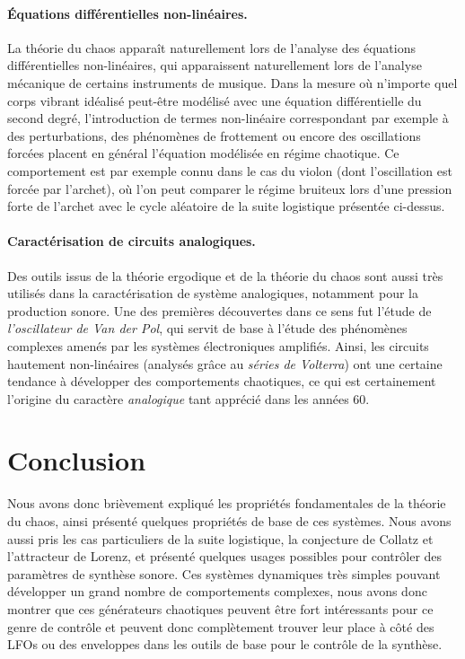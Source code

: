 \documentclass[12pt,a4paper]{article}
\begin{document}
\paragraph{Équations différentielles non-linéaires.} La théorie du chaos apparaît naturellement lors de l'analyse des équations différentielles non-linéaires, qui apparaissent naturellement lors de l'analyse mécanique de certains instruments de musique. Dans la mesure où n'importe quel corps vibrant idéalisé peut-être modélisé avec une équation différentielle du second degré, l'introduction de termes non-linéaire correspondant par exemple à des perturbations, des phénomènes de frottement  ou encore des oscillations forcées placent en général l'équation modélisée en régime chaotique. Ce comportement est par exemple connu dans le cas du violon (dont l'oscillation est forcée par l'archet), où l'on peut comparer le régime bruiteux lors d'une pression forte de l'archet avec le cycle aléatoire de la suite logistique présentée ci-dessus. 

\paragraph{Caractérisation de circuits analogiques.}  Des outils issus de la théorie ergodique et de la théorie du chaos sont aussi très utilisés dans la caractérisation de système analogiques, notamment pour la production sonore. Une des premières découvertes dans ce sens fut l'étude de \textit{l'oscillateur de Van der Pol}, qui servit de base à l'étude des phénomènes complexes amenés par les systèmes électroniques amplifiés. Ainsi, les circuits hautement non-linéaires (analysés grâce au \textit{séries de Volterra}) ont une certaine tendance à développer des comportements chaotiques, ce qui est certainement l'origine du caractère \textit{analogique} tant apprécié dans les années 60.


\section{Conclusion}
Nous avons donc brièvement expliqué les propriétés fondamentales de la théorie du chaos, ainsi présenté quelques propriétés de base de ces systèmes. Nous avons aussi pris les cas particuliers de la suite logistique, la conjecture de Collatz et l'attracteur de Lorenz, et présenté quelques usages possibles pour contrôler des paramètres de synthèse sonore. Ces systèmes dynamiques très simples pouvant développer un grand nombre de comportements complexes, nous avons donc montrer que ces générateurs chaotiques peuvent être fort intéressants pour ce genre de contrôle et peuvent donc complètement trouver leur place à côté des LFOs ou des enveloppes dans les outils de base pour le contrôle de la synthèse.


 
 
\end{document}
